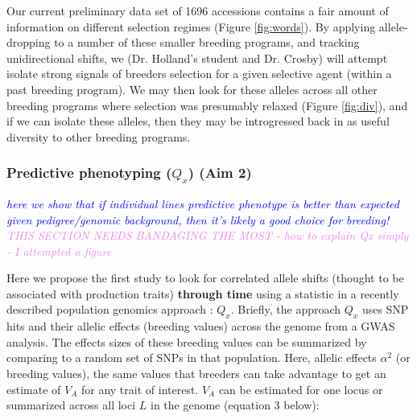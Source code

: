 \documentclass[12pt]{article}
\newcommand{\jri}[1]{\textcolor{blue}{ \emph{\scriptsize  #1}} }
\newcommand{\kc}[1]{\textcolor{violet}{ \emph{\scriptsize  #1}} }
\begin{document}

Our current preliminary data set of 1696 accessions contains a fair amount of information on different selection regimes (Figure \ref{fig:words}). 
By applying allele-dropping to a number of these smaller breeding programs, and tracking unidirectional shifts, we (Dr. Holland's student and Dr. Crosby) will attempt isolate strong signals of breeders selection for a given selective agent (within a past breeding program). 
We may then look for these alleles across all other breeding programs where selection was presumably relaxed (Figure \ref{fig:div}), and if we can isolate these alleles, then they may be introgressed back in as useful diversity to other breeding programs.

\subsubsection*{Predictive phenotyping ($Q_{x}$) (Aim 2)}
\jri{here we show that if individual lines predictive phenotype is better than expected given pedigree/genomic background, then it's likely a good choice for breeding! }
\kc{THIS SECTION NEEDS BANDAGING THE MOST - how to explain Qx simply - I attempted a figure}

Here we propose the first study to look for correlated allele shifts (thought to be associated with production traits) \textbf{through time} using a statistic in a recently described population genomics approach \cite{Berg:2014bs}: $Q_{x}$. 
Briefly, the approach $Q_{x}$ uses SNP hits and their allelic effects (breeding values) across the genome from a GWAS analysis. The effects sizes of these breeding values can be summarized by comparing to a random set of SNPs in that population. Here, allelic effects $\alpha^{2}$ (or breeding values), the same values that  breeders can take advantage to get an estimate of $V_{A}$ for any trait of interest. $V_{A}$ can be estimated for one locus or summarized across all loci $L$ in the genome (equation 3 below):
\end{document}
